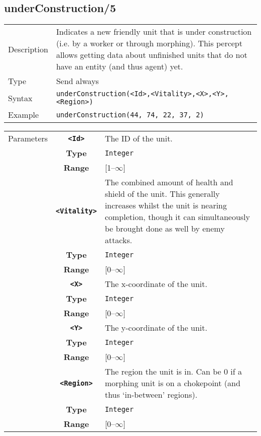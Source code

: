 \subsection{underConstruction/5}
\begin{tabularx}{\textwidth}{lX}
 Description & Indicates a new friendly unit that is under construction (i.e. by a worker or through morphing). This percept allows getting data about unfinished units that do not have an entity (and thus agent) yet. \\
 Type & Send always \\
 Syntax & \verb|underConstruction(<Id>,<Vitality>,<X>,<Y>,<Region>)| \\
 Example & \verb|underConstruction(44, 74, 22, 37, 2)|   \\
 \end{tabularx}
 \begin{tabularx}{\textwidth}{l | c | p{8cm}|}
 \cline{2-3}
 Parameters & \textbf{\verb|<Id>|} & The ID of the unit.\\
            & \textbf{Type} & \verb|Integer| \\
            & \textbf{Range} & [1--$\infty$] \\
            \cline{2-3}
            & \textbf{\verb|<Vitality>|} & The combined amount of health and shield of the unit. This generally increases whilst the unit is nearing completion, though it can simultaneously be brought done as well by enemy attacks.\\
            & \textbf{Type} & \verb|Integer| \\
            & \textbf{Range} & [0--$\infty$] \\
            \cline{2-3}
            & \textbf{\verb|<X>|} & The x-coordinate of the unit. \\
            & \textbf{Type} & \verb|Integer| \\
            &\textbf{Range} &  [0--$\infty$] \\
            \cline{2-3}
            & \textbf{\verb|<Y>|} & The y-coordinate of the unit. \\
            & \textbf{Type} & \verb|Integer| \\
            &\textbf{Range} & [0--$\infty$] \\
            \cline{2-3}
            & \textbf{\verb|<Region>|} & The region the unit is in. Can be 0 if a morphing unit is on a chokepoint (and thus `in-between' regions).\\
            & \textbf{Type} & \verb|Integer| \\
            & \textbf{Range} & [0--$\infty$] \\
            \cline{2-3}
\end{tabularx}

